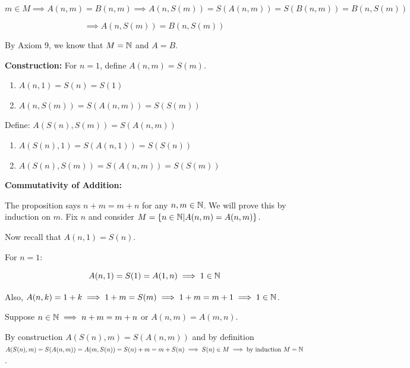 \[
	m \in M \implies A(n, m) = B(n, m) \implies A(n, S(m)) = S(A(n, m)) = S(B(n, m)) = B(n, S(m))
\]

\[
	\implies A(n , S(m)) = B(n, S(m))
\]

By Axiom 9, we know that \(M = \mathbb{N}\) and \(A = B\).

\textbf{Construction:} For \(n = 1\), define \(A(n, m) = S(m)\).

\begin{enumerate}
	
	\item \(A(n, 1) = S(n) = S(1)\)
	
	\item \(A(n, S(m)) = S(A(n, m)) = S(S(m))\)

\end{enumerate}

Define: \(A(S(n), S(m)) = S(A(n, m))\)

\begin{enumerate}

	\item \(A(S(n), 1) = S(A(n, 1)) = S(S(n))\)

	\item \(A(S(n), S(m)) = S(A(n, m)) = S(S(m))\)

\end{enumerate}

\textbf{Commutativity of Addition:}

The proposition says \(n + m = m + n\) for any \(n, m \in \mathbb{N}\). We will prove this by 
induction on \(m\). Fix \(n\) and consider \(M = \{ n \in \mathbb{N} | A(n, m) = A(n, m)\}\).

Now recall that \(A(n, 1) = S(n)\).

For \(n = 1\):

\[
	A(n, 1) = S(1) = A(1, n) \implies 1 \in \mathbb{N}
\]

Also, \(A(n , k) = 1 + k \implies 1 + m = S(m) \implies 1 + m = m + 1 \implies 1 \in \mathbb{N}\).

Suppose \(n \in \mathbb{N} \implies n + m = m + n\) or \(A(n, m) = A(m, n)\).

By construction \(A(S(n), m) = S(A(n, m))\) and by definition
\(A(S(n), m) = S(A(n, m)) = A(m, S(n)) = S(n) + m =  m + S(n) \implies S(n) \in M \implies 
\text{by induction } M = \mathbb{N}\).
